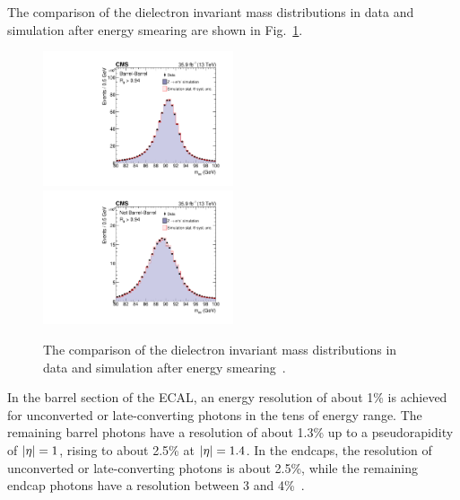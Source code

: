 	The comparison of the dielectron invariant mass distributions in data and simulation after energy smearing are shown in Fig.~\ref{fig:ZeeComp}. 
		\begin{figure}[!ht]
		  \centering
		  \includegraphics[width=0.5\textwidth]{Fig/ObjReco/Figure_001-a}~
		  \includegraphics[width=0.5\textwidth]{Fig/ObjReco/Figure_001-b}\\
		  \caption{The comparison of the dielectron invariant mass distributions in data and simulation after energy smearing~\cite{Sirunyan:2018ouh}.}
		  \label{fig:ZeeComp}
		\end{figure}
		
		In the barrel section of the ECAL, an energy resolution of about 1\% is achieved for unconverted or late-converting photons in the tens of \GeV energy range. The remaining barrel photons have a resolution of about 1.3\% up to a pseudorapidity of $\lvert \eta \rvert = 1$, rising to about 2.5\% at $\lvert \eta \rvert = 1.4$. In the endcaps, the resolution of unconverted or late-converting photons is about 2.5\%, while the remaining endcap photons have a resolution between 3 and 4\%~\cite{CMS:EGM-14-001}.		

